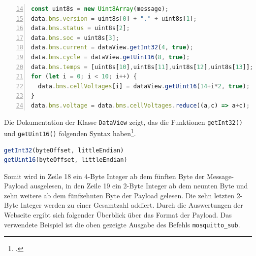 \begin{lstlisting}[language=JavaScript,numbers=left,xleftmargin=2.5em,framexleftmargin=2em,firstnumber=14,label={lst:bms-reverse}]
const uint8s = new Uint8Array(message);
data.bms.version = uint8s[0] + "." + uint8s[1];
data.bms.status = uint8s[2];
data.bms.soc = uint8s[3];
data.bms.current = dataView.getInt32(4, true);
data.bms.cycle = dataView.getUint16(8, true);
data.bms.temps = [uint8s[10],uint8s[11],uint8s[12],uint8s[13]];
for (let i = 0; i < 10; i++) {
  data.bms.cellVoltages[i] = dataView.getUint16(14+i*2, true);
}
data.bms.voltage = data.bms.cellVoltages.reduce((a,c) => a+c);
\end{lstlisting}

\noindent Die Dokumentation der Klasse \texttt{DataView} zeigt, das die Funktionen \texttt{getInt32()} und \texttt{getUint16()}
folgenden Syntax haben\footcite{dataview}.

\begin{lstlisting}[language=JavaScript]
getInt32(byteOffset, littleEndian)
getUint16(byteOffset, littleEndian)
\end{lstlisting}

Somit wird in Zeile \num{18} ein \num{4}-Byte Integer ab dem fünften Byte der Message-Payload ausgelesen, in den Zeile
\num{19} ein \num{2}-Byte Integer ab dem neunten Byte und zehn weitere ab dem fünfzehnten Byte der Payload gelesen.
Die zehn letzten \num{2}-Byte Integer werden zu einer Gesamtzahl addiert.
Durch die Auswertungen der Webseite ergibt sich folgender Überblick über das Format der Payload.
Das verwendete Beispiel ist die oben gezeigte Ausgabe des Befehls \texttt{mosquitto\_\allowbreak sub}.

